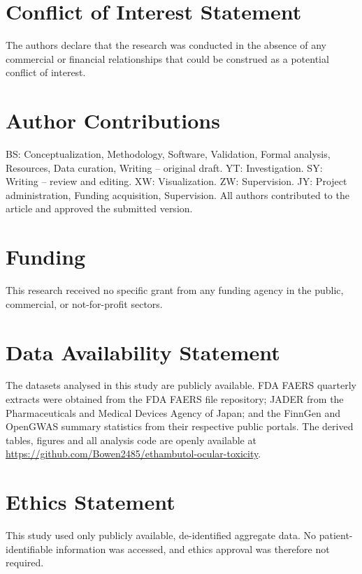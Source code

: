 \documentclass[utf8]{FrontiersinVancouver}
\begin{document}
\section*{Conflict of Interest Statement}

The authors declare that the research was conducted in the absence of any commercial
or financial relationships that could be construed as a potential conflict of interest.

\section*{Author Contributions}

BS: Conceptualization, Methodology, Software, Validation, Formal analysis, Resources,
Data curation, Writing -- original draft. YT: Investigation. SY: Writing -- review and
editing. XW: Visualization. ZW: Supervision. JY: Project administration, Funding
acquisition, Supervision. All authors contributed to the article and approved the
submitted version.

\section*{Funding}

This research received no specific grant from any funding agency in the public,
commercial, or not-for-profit sectors.

\section*{Data Availability Statement}

The datasets analysed in this study are publicly available. FDA FAERS quarterly
extracts were obtained from the FDA FAERS file repository; JADER from the
Pharmaceuticals and Medical Devices Agency of Japan; and the FinnGen and OpenGWAS
summary statistics from their respective public portals. The derived tables, figures
and all analysis code are openly available at
\url{https://github.com/Bowen2485/ethambutol-ocular-toxicity}.

\section*{Ethics Statement}

This study used only publicly available, de-identified aggregate data. No
patient-identifiable information was accessed, and ethics approval was therefore not
required.
\end{document}
